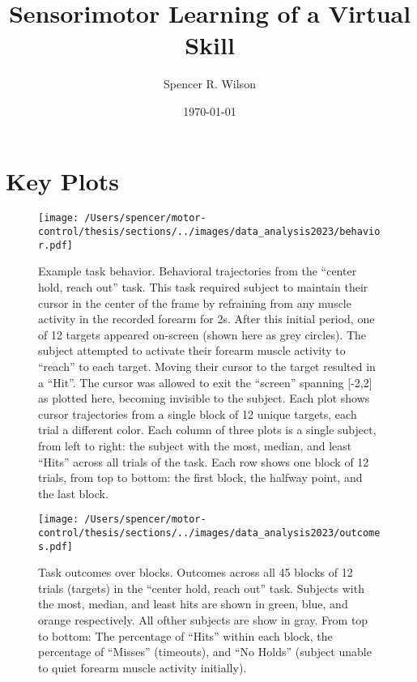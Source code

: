 \documentclass[
  a4paper,
]{article}
\title{Sensorimotor Learning of a Virtual Skill}
\author{Spencer R. Wilson}
\date{\today}
\begin{document}
\maketitle

\hypertarget{sec:data}{%
\section{Key Plots}\label{sec:data}}

\begin{figure}
\hypertarget{fig:behavior}{%
\centering
\texttt{[image: /Users/spencer/motor-control/thesis/sections/../images/data\_analysis2023/behavior.pdf]}
\caption{Example task behavior. Behavioral trajectories from the
``center hold, reach out'' task. This task required subject to maintain
their cursor in the center of the frame by refraining from any muscle
activity in the recorded forearm for 2s. After this initial period, one
of 12 targets appeared on-screen (shown here as grey circles). The
subject attempted to activate their forearm muscle activity to ``reach''
to each target. Moving their cursor to the target resulted in a ``Hit''.
The cursor was allowed to exit the ``screen'' spanning {[}-2,2{]} as
plotted here, becoming invisible to the subject. Each plot shows cursor
trajectories from a single block of 12 unique targets, each trial a
different color. Each column of three plots is a single subject, from
left to right: the subject with the most, median, and least ``Hits''
across all trials of the task. Each row shows one block of 12 trials,
from top to bottom: the first block, the halfway point, and the last
block.}\label{fig:behavior}
}
\end{figure}

\begin{figure}
\hypertarget{fig:outcomes}{%
\centering
\texttt{[image: /Users/spencer/motor-control/thesis/sections/../images/data\_analysis2023/outcomes.pdf]}
\caption{Task outcomes over blocks. Outcomes across all 45 blocks of 12
trials (targets) in the ``center hold, reach out'' task. Subjects with
the most, median, and least hits are shown in green, blue, and orange
respectively. All ofther subjects are show in gray. From top to bottom:
The percentage of ``Hits'' within each block, the percentage of
``Misses'' (timeouts), and ``No Holds'' (subject unable to quiet forearm
muscle activity initially).}\label{fig:outcomes}
}
\end{figure}
\end{document}
